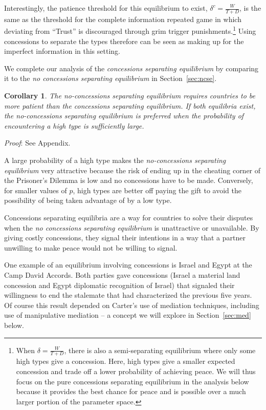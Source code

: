 \documentclass[12pt, letterpaper]{article}
\newcommand{\de}{\delta}
\newtheorem{corollary}{Corollary}
\begin{document}
Interestingly, the patience threshold for this equilibrium to exist, $\de^c = \frac{W}{T+D}$, is the same as the threshold for the complete information repeated game in which deviating from ``Trust'' is discouraged through grim trigger punishments.\footnote{When $\de = \frac{W}{T+D}$, there is also a semi-separating equilibrium where only some high types give a concession. Here, high types give a smaller expected concession and trade off a lower probability of achieving peace. We will thus focus on the pure concessions separating equilibrium in the analysis below because it provides the best chance for peace and is possible over a much larger portion of the parameter space.} Using concessions to separate the types therefore can be seen as making up for the imperfect information in this setting.

We complete our analysis of the \emph{concessions separating equilibrium} by comparing it to the \emph{no concessions separating equilibrium} in Section~\ref{sec:ncse}.

\begin{corollary}
	The \emph{no-concessions separating equilibrium} requires countries to be more patient than the \emph{concessions separating equilibrium}. If both equilibria exist, the \emph{no-concessions separating equilibrium} is preferred when the probability of encountering a high type is sufficiently large.
	\label{corollary:1}
\end{corollary}
\emph{Proof}: See Appendix.

A large probability of a high type makes the \emph{no-concessions separating equilibrium} very attractive because the risk of ending up in the cheating corner of the Prisoner's Dilemma is low and no concessions have to be made. Conversely, for smaller values of $p$, high types are better off paying the gift to avoid the possibility of being taken advantage of by a low type.

Concessions separating equilibria are a way for countries to solve their disputes when the \emph{no concessions separating equilibrium} is unattractive or unavailable. By giving costly concessions, they signal their intentions in a way that a partner unwilling to make peace would not be willing to signal. 

One example of an equilibrium involving concessions is Israel and Egypt at the Camp David Accords. Both parties gave concessions (Israel a material land concession and Egypt diplomatic recognition of Israel) that signaled their willingness to end the stalemate that had characterized the previous five years. Of course this result depended on Carter's use of mediation techniques, including use of manipulative mediation -- a concept we will explore in Section~\ref{sec:med} below. 
\end{document}
